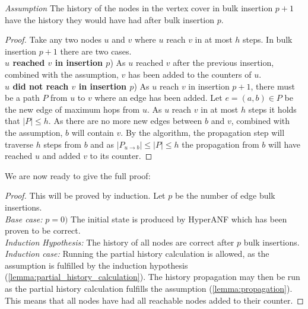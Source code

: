 \begin{theorem}
\begin{lemma}
\noindent\textit{Assumption } The history of the nodes in the vertex cover in bulk insertion $p+1$ have the history they would have had after bulk insertion $p$.

\begin{proof}

\noindent Take any two nodes $u$ and $v$ where $u$ reach $v$ in at most $h$ steps. In bulk insertion $p+1$ there are two cases. \\

\noindent\textbf{$u$ reached $v$ in insertion $p$}) As $u$ reached $v$ after the previous insertion, combined with the assumption, $v$ has been added to the counters of $u$. \\

\noindent\textbf{$u$ did not reach $v$ in insertion $p$}) As $u$ reach $v$ in insertion $p+1$, there must be a path $P$ from $u$ to $v$ where an edge has been added. Let $e = (a,b) \in P$ be the new edge of maximum hops from $u$. As $u$ reach $v$ in at most $h$ steps it holds that $|P| \leq h$.
As there are no more new edges between $b$ and $v$, combined with the assumption, $b$ will contain $v$. By the algorithm, the propagation step will traverse $h$ steps from $b$ and as 
$|P_{u \rightarrow b}| \leq |P| \leq h$ the propagation from $b$ will have reached $u$ and added $v$ to its counter. 

\end{proof}
\end{lemma}
\noindent We are now ready to give the full proof:

\begin{proof} This will be proved by induction. Let $p$ be the number of edge bulk insertions.\\

\noindent\textit{Base case:} $p = 0)$ The initial state is produced by HyperANF which has been proven to be correct.\\

\noindent\textit{Induction Hypothesis:} The history of all nodes are correct after $p$ bulk insertions.\\

\iffalse
Given that the history of all nodes are correct after insertion $p$, they will be correct after insertion $p+1$.\\
\fi

\noindent\textit{Induction case:}
Running the partial history calculation is allowed, as the assumption is fulfilled by the induction hypothesis (\ref{lemma:partial_history_calculation}). The history propagation may then be run as the partial history calculation fulfills the assumption (\ref{lemma:propagation}). This means that all nodes have had all reachable nodes added to their counter.

\end{proof}
\end{theorem}









